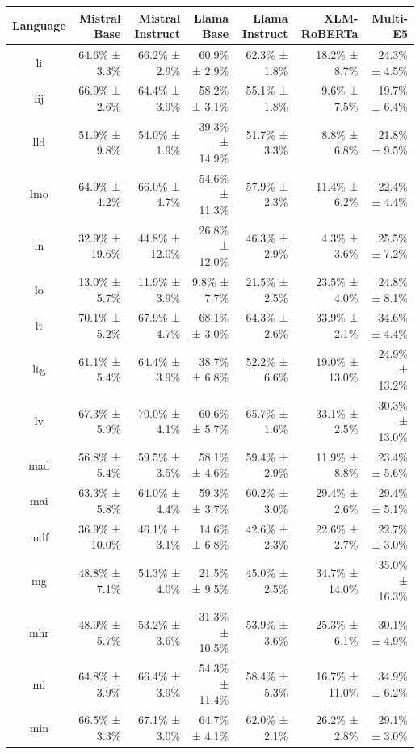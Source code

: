 \documentclass[10pt, a4paper]{article}
\begin{document}
\begin{table}[h]
\centering
\scriptsize
\begin{tabular}{crrrrrr}
\toprule
Language & Mistral Base & Mistral Instruct & Llama Base & Llama Instruct & XLM-RoBERTa & Multi-E5 \\
\midrule
li & 64.6\% ± 3.3\% & 66.2\% ± 2.9\% & 60.9\% ± 2.9\% & 62.3\% ± 1.8\% & 18.2\% ± 8.7\% & 24.3\% ± 4.5\% \\
lij & 66.9\% ± 2.6\% & 64.4\% ± 3.9\% & 58.2\% ± 3.1\% & 55.1\% ± 1.8\% & 9.6\% ± 7.5\% & 19.7\% ± 6.4\% \\
lld & 51.9\% ± 9.8\% & 54.0\% ± 1.9\% & 39.3\% ± 14.9\% & 51.7\% ± 3.3\% & 8.8\% ± 6.8\% & 21.8\% ± 9.5\% \\
lmo & 64.9\% ± 4.2\% & 66.0\% ± 4.7\% & 54.6\% ± 11.3\% & 57.9\% ± 2.3\% & 11.4\% ± 6.2\% & 22.4\% ± 4.4\% \\
ln & 32.9\% ± 19.6\% & 44.8\% ± 12.0\% & 26.8\% ± 12.0\% & 46.3\% ± 2.9\% & 4.3\% ± 3.6\% & 25.5\% ± 7.2\% \\
lo & 13.0\% ± 5.7\% & 11.9\% ± 3.9\% & 9.8\% ± 7.7\% & 21.5\% ± 2.5\% & 23.5\% ± 4.0\% & 24.8\% ± 8.1\% \\
lt & 70.1\% ± 5.2\% & 67.9\% ± 4.7\% & 68.1\% ± 3.0\% & 64.3\% ± 2.6\% & 33.9\% ± 2.1\% & 34.6\% ± 4.4\% \\
ltg & 61.1\% ± 5.4\% & 64.4\% ± 3.9\% & 38.7\% ± 6.8\% & 52.2\% ± 6.6\% & 19.0\% ± 13.0\% & 24.9\% ± 13.2\% \\
lv & 67.3\% ± 5.9\% & 70.0\% ± 4.1\% & 60.6\% ± 5.7\% & 65.7\% ± 1.6\% & 33.1\% ± 2.5\% & 30.3\% ± 13.0\% \\
mad & 56.8\% ± 5.4\% & 59.5\% ± 3.5\% & 58.1\% ± 4.6\% & 59.4\% ± 2.9\% & 11.9\% ± 8.8\% & 23.4\% ± 5.6\% \\
mai & 63.3\% ± 5.8\% & 64.0\% ± 4.4\% & 59.3\% ± 3.7\% & 60.2\% ± 3.0\% & 29.4\% ± 2.6\% & 29.4\% ± 5.1\% \\
mdf & 36.9\% ± 10.0\% & 46.1\% ± 3.1\% & 14.6\% ± 6.8\% & 42.6\% ± 2.3\% & 22.6\% ± 2.7\% & 22.7\% ± 3.0\% \\
mg & 48.8\% ± 7.1\% & 54.3\% ± 4.0\% & 21.5\% ± 9.5\% & 45.0\% ± 2.5\% & 34.7\% ± 14.0\% & 35.0\% ± 16.3\% \\
mhr & 48.9\% ± 5.7\% & 53.2\% ± 3.6\% & 31.3\% ± 10.5\% & 53.9\% ± 3.6\% & 25.3\% ± 6.1\% & 30.1\% ± 4.9\% \\
mi & 64.8\% ± 3.9\% & 66.4\% ± 3.9\% & 54.3\% ± 11.4\% & 58.4\% ± 5.3\% & 16.7\% ± 11.0\% & 34.9\% ± 6.2\% \\
min & 66.5\% ± 3.3\% & 67.1\% ± 3.0\% & 64.7\% ± 4.1\% & 62.0\% ± 2.1\% & 26.2\% ± 2.8\% & 29.1\% ± 3.0\% \\

\end{tabular}
\end{table}
\end{document}
